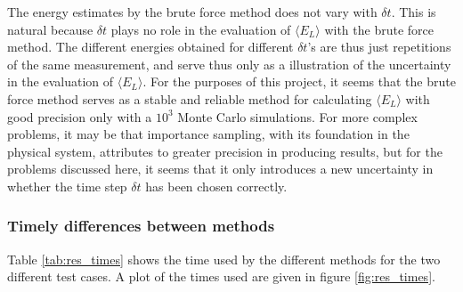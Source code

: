 The energy estimates by the brute force method does not vary with $\delta t$. 
This is natural because $\delta t$ plays no role in the evaluation of $\langle E_L \rangle$ with the brute force method. 
The different energies obtained for different $\delta t$'s are thus just repetitions of the same measurement, and serve thus only as a illustration of the uncertainty in the evaluation of $\langle E_L \rangle$. 
For the purposes of this project, it seems that the brute force method serves as a stable and reliable method for calculating $\langle E_L \rangle$ with good precision only with a $10^3$ Monte Carlo simulations. 
For more complex problems, it may be that importance sampling, with its foundation in the physical system, attributes to greater precision in producing results, but for the problems discussed here, it seems that it only introduces a new uncertainty in whether the time step $\delta t$ has been chosen correctly. 











\subsubsection{Timely differences between methods} \label{sec:timely_diff}

Table \ref{tab:res_times} shows the time used by the different methods for the two different test cases.
A plot of the times used are given in figure \ref{fig:res_times}. 

